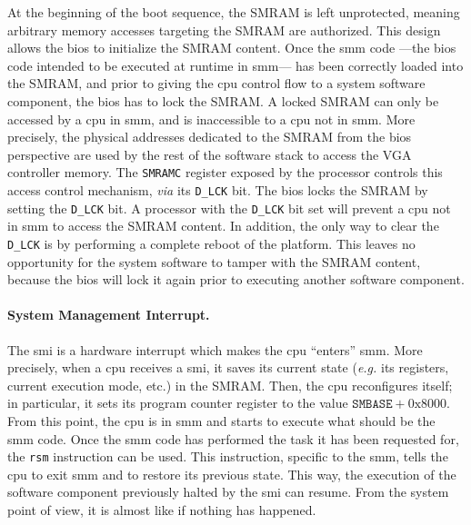 At the beginning of the boot sequence, the SMRAM is left unprotected, meaning
arbitrary memory accesses targeting the SMRAM are authorized.
%
This design allows the \ac{bios} to initialize the SMRAM content.
%
Once the \ac{smm} code ---the \ac{bios} code intended to be executed at runtime
in \ac{smm}--- has been correctly loaded into the SMRAM, and prior to giving the
\ac{cpu} control flow to a system software component, the \ac{bios} has to lock
the SMRAM.
%
A locked SMRAM can only be accessed by a \ac{cpu} in \ac{smm}, and is
inaccessible to a \ac{cpu} not in \ac{smm}.
%
More precisely, the physical addresses dedicated to the SMRAM from the \ac{bios}
perspective are used by the rest of the software stack to access the VGA
controller memory.
%
The \texttt{SMRAMC} register exposed by the processor controls this access
control mechanism, \emph{via} its \texttt{D\_LCK} bit.
%
The \ac{bios} locks the SMRAM by setting the \texttt{D\_LCK} bit.
%
A processor with the \texttt{D\_LCK} bit set will prevent a \ac{cpu} not in
\ac{smm} to access the SMRAM content.
%
In addition, the only way to clear the \texttt{D\_LCK} is by performing a
complete reboot of the platform.
%
This leaves no opportunity for the system software to tamper with the SMRAM
content, because the \ac{bios} will lock it again prior to executing another
software component.

\paragraph{System Management Interrupt.}

The \ac{smi} is a hardware interrupt which makes the \ac{cpu} ``enters''
\ac{smm}.
%
More precisely, when a \ac{cpu} receives a \ac{smi}, it saves its current state
(\emph{e.g.} its registers, current execution mode, etc.) in the SMRAM.
%
Then, the \ac{cpu} reconfigures itself;
%
in particular, it sets its program counter register to the value
$\mathtt{SMBASE} + \mathrm{0x8000}$.
%
From this point, the \ac{cpu} is in \ac{smm} and starts to execute what should
be the \ac{smm} code.
%
Once the \ac{smm} code has performed the task it has been requested for, the
\texttt{rsm} instruction can be used.
%
This instruction, specific to the \ac{smm}, tells the \ac{cpu} to exit \ac{smm}
and to restore its previous state.
%
This way, the execution of the software component previously halted by the
\ac{smi} can resume.
%
From the system point of view, it is almost like if nothing has happened.

